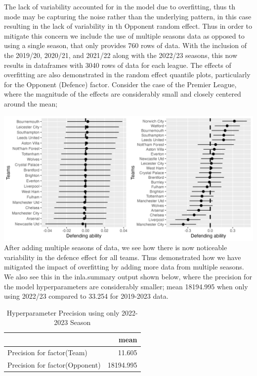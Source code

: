 \documentclass[
]{article}
\begin{document}
The lack of variability accounted for in the model due to overfitting,
thus th mode may be capturing the noise rather than the underlying
pattern, in this case resulting in the lack of variability in th
Opponent random effect. Thus in order to mitigate this concern we
include the use of multiple seasons data as opposed to using a single
season, that only provides 760 rows of data. With the inclusion of the
2019/20, 2020/21, and 2021/22 along with the 2022/23 seasons, this now
results in dataframes with 3040 rows of data for each league. The
effects of overfitting are also demonstrated in the random effect
quantile plots, particularly for the Opponent (Defence) factor. Consider
the case of the Premier League, where the magnitude of the effects are
considerably small and closely centered around the mean;

\includegraphics[width=33.33in]{allvssingledefprem} After adding
multiple seasons of data, we see how there is now noticeable variability
in the defence effect for all teams. Thus demonstrated how we have
mitigated the impact of overfitting by adding more data from multiple
seasons. We also see this in the inla.summary output shown below, where
the precision for the model hyperparameters are considerably smaller;
mean 18194.995 when only using 2022/23 compared to 33.254 for 2019-2023
data.

\begin{table}

\caption{\label{tab:unnamed-chunk-5}Hyperparameter Precision using only 2022-2023 Season}
\centering
\begin{tabular}[t]{l|r}
\hline
  & mean\\
\hline
Precision for factor(Team) & 11.605\\
\hline
Precision for factor(Opponent) & 18194.995\\
\hline
\end{tabular}
\end{table}
\end{document}
